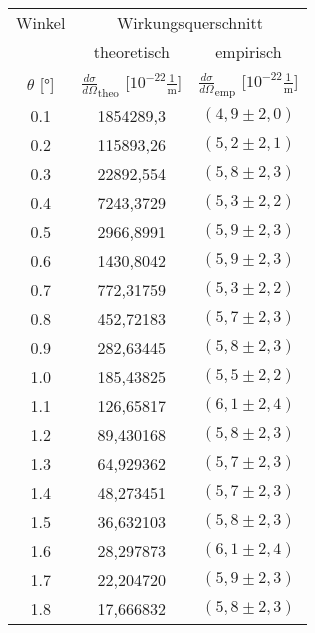\begin{table}
[H]
  \center
\begin{tabular}{c|c|c}
\toprule

Winkel & \multicolumn{2}{c}{Wirkungsquerschnitt} \\
       &
 theoretisch & empirisch \\
$\theta$ [°]
& $\frac{d\sigma}{d\Omega}_{\text{theo}}$ [$10^{-22}\frac{1}{\text{m}}$]
& $\frac{d\sigma}{d\Omega}_{\text{emp}}$ [$10^{-22}\frac{1}{\text{m}}$] \\
\midrule
 0.1 & 1854289,3 & $(4,9\pm2,0)$\\

 0.2 & 115893,26 & $(5,2\pm2,1)$\\

 0.3 & 22892,554 & $(5,8\pm2,3)$\\

 0.4 & 7243,3729 & $(5,3\pm2,2)$\\

 0.5 & 2966,8991 & $(5,9\pm2,3)$\\

 0.6 & 1430,8042 & $(5,9\pm2,3)$\\

 0.7 & 772,31759 & $(5,3\pm2,2)$\\

 0.8 & 452,72183 & $(5,7\pm2,3)$\\

 0.9 & 282,63445 & $(5,8\pm2,3)$\\

 1.0 & 185,43825 & $(5,5\pm2,2)$\\

 1.1 & 126,65817 & $(6,1\pm2,4)$\\

 1.2 & 89,430168 & $(5,8\pm2,3)$\\

 1.3 & 64,929362 & $(5,7\pm2,3)$\\

 1.4 & 48,273451 & $(5,7\pm2,3)$\\

 1.5 & 36,632103 & $(5,8\pm2,3)$\\

 1.6 & 28,297873 & $(6,1\pm2,4)$\\

 1.7 & 22,204720 & $(5,9\pm2,3)$\\

 1.8 & 17,666832 & $(5,8\pm2,3)$\\


\end{tabular}
\end{table}
